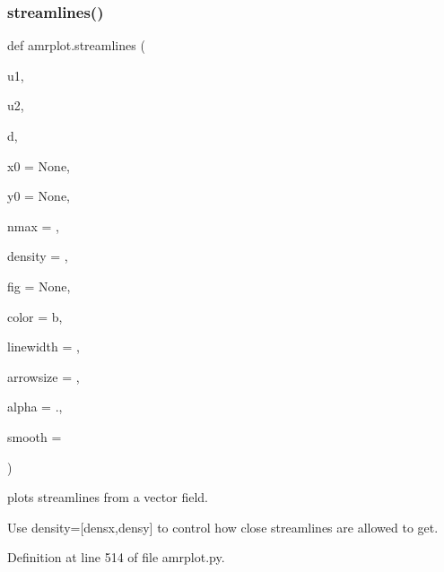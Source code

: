 \subsubsection{\texorpdfstring{streamlines()}{streamlines()}}
{\footnotesize\ttfamily def amrplot.\+streamlines (\begin{DoxyParamCaption}\item[{}]{u1,  }\item[{}]{u2,  }\item[{}]{d,  }\item[{}]{x0 = {\ttfamily None},  }\item[{}]{y0 = {\ttfamily None},  }\item[{}]{nmax = {},  }\item[{}]{density = {},  }\item[{}]{fig = {\ttfamily None},  }\item[{}]{color = {\ttfamily \textquotesingle{}b\textquotesingle{}},  }\item[{}]{linewidth = {},  }\item[{}]{arrowsize = {},  }\item[{}]{alpha = {.},  }\item[{}]{smooth = {} }\end{DoxyParamCaption})}



plots streamlines from a vector field. 

Use density=\mbox{[}densx,densy\mbox{]} to control how close streamlines are allowed to get. 

Definition at line 514 of file amrplot.\+py.


